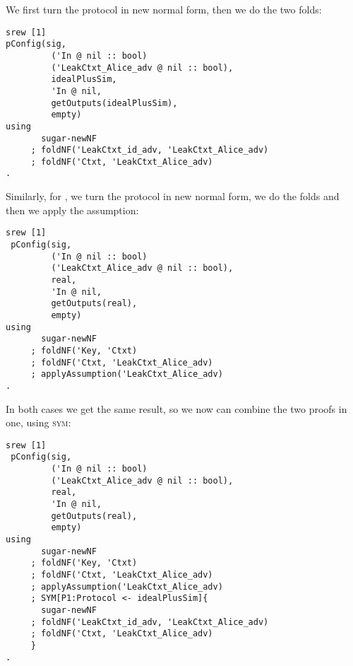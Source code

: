 We first turn the protocol in new normal form, then we do the two folds:
\begin{lstlisting}
srew [1] 
pConfig(sig, 
         ('In @ nil :: bool) 
         ('LeakCtxt_Alice_adv @ nil :: bool), 
         idealPlusSim, 
         'In @ nil, 
         getOutputs(idealPlusSim), 
         empty)
using 
       sugar-newNF
     ; foldNF('LeakCtxt_id_adv, 'LeakCtxt_Alice_adv) 
     ; foldNF('Ctxt, 'LeakCtxt_Alice_adv)    
.

\end{lstlisting}

Similarly, for , we turn the protocol in new normal form,
we do the folds and then we apply the assumption:
\begin{lstlisting}
srew [1] 
 pConfig(sig, 
         ('In @ nil :: bool) 
         ('LeakCtxt_Alice_adv @ nil :: bool), 
         real, 
         'In @ nil, 
         getOutputs(real), 
         empty)
using 
       sugar-newNF
     ; foldNF('Key, 'Ctxt)
     ; foldNF('Ctxt, 'LeakCtxt_Alice_adv)
     ; applyAssumption('LeakCtxt_Alice_adv)
. 
\end{lstlisting}

In both cases we get the same result, so we now can combine the two proofs in one, using \textsc{sym}:
\begin{lstlisting}
srew [1] 
 pConfig(sig, 
         ('In @ nil :: bool) 
         ('LeakCtxt_Alice_adv @ nil :: bool), 
         real, 
         'In @ nil, 
         getOutputs(real), 
         empty)
using 
       sugar-newNF
     ; foldNF('Key, 'Ctxt)
     ; foldNF('Ctxt, 'LeakCtxt_Alice_adv)
     ; applyAssumption('LeakCtxt_Alice_adv)
     ; SYM[P1:Protocol <- idealPlusSim]{
       sugar-newNF
     ; foldNF('LeakCtxt_id_adv, 'LeakCtxt_Alice_adv) 
     ; foldNF('Ctxt, 'LeakCtxt_Alice_adv)  
     }
.  
\end{lstlisting}


